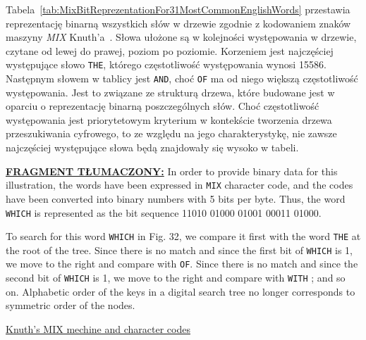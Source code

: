 	Tabela~\ref{tab:MixBitReprezentationFor31MostCommonEnglishWords} przestawia reprezentację binarną wszystkich słów w drzewie zgodnie z kodowaniem znaków maszyny \emph{MIX} Knuth'a~\cite{wikiMix}. Słowa ułożone są w kolejności występowania w drzewie, czytane od lewej do prawej, poziom po poziomie. Korzeniem jest najczęściej występujące słowo \texttt{THE}, którego częstotliwość występowania wynosi 15586. Następnym słowem w tablicy jest \texttt{AND}, choć \texttt{OF} ma od niego większą częstotliwość występowania. Jest to związane ze strukturą drzewa, które budowane jest w oparciu o reprezentację binarną poszczególnych słów. Choć częstotliwość występowania jest priorytetowym kryterium w kontekście tworzenia drzewa przeszukiwania cyfrowego, to ze względu na jego charakterystykę, nie zawsze najczęściej występujące słowa będą znajdowały się wysoko w tabeli.\newline 	
	
	\ifsourcematerial
	\begin{displayquote}
		\color{ao(english)}
		\underline{\textbf{FRAGMENT TŁUMACZONY:}} \newline 
		In order to provide binary data for this illustration, the
		words have been expressed in \texttt{MIX}
		character code, and the codes have been
		converted into binary numbers with 5 bits per byte. Thus, the word \texttt{WHICH}
		is represented as the bit sequence 11010 01000 01001 00011 01000. 
		
		To search for this word \texttt{WHICH}
		in Fig. 32, we compare it first with the word \texttt{THE}
		at the root of the tree. Since there is no match and since the first bit of \texttt{WHICH}
		is 1, we move to the right and compare with \texttt{OF}. Since there is no match
		and since the second bit of \texttt{WHICH}
		is 1, we move to the right and compare with \texttt{WITH}
		; and so on. Alphabetic order of the keys in a digital search tree no longer
		corresponds to symmetric order of the nodes.
		
		\color{graphcolorblue}
		\href{https://esolangs.org/wiki/MIX_(Knuth)#General}{Knuth's MIX mechine and character codes}
	\end{displayquote}
	\fi
	
